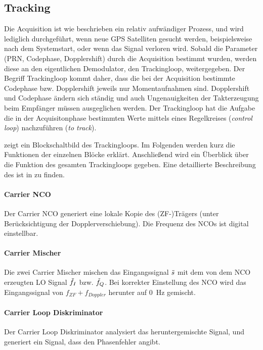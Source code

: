 \subsection{Tracking}
Die Acquisition ist wie beschrieben ein relativ aufwändiger Prozess, und wird lediglich durchgeführt, wenn neue GPS Satelliten gesucht werden, beispielsweise nach dem Systemstart, oder wenn das Signal verloren wird. Sobald die Parameter (PRN, Codephase, Dopplershift) durch die Acquisition bestimmt wurden, werden diese an den eigentlichen Demodulator, den Trackingloop, weitergegeben. Der Begriff Trackingloop kommt daher, dass die bei der Acquisition bestimmte Codephase bzw. Dopplershift jeweils nur Momentaufnahmen sind. Dopplershift und Codephase ändern sich ständig und auch Ungenauigkeiten der Takterzeugung beim Empfänger müssen ausgeglichen werden. Der Trackingloop hat die Aufgabe die in der Acquisitonphase bestimmten Werte mittels eines Regelkreises (\emph{control loop}) nachzuführen (\emph{to track}). 


 zeigt ein Blockschaltbild des Trackingloops. Im Folgenden werden kurz die Funktionen der einzelnen Blöcke erklärt. Anschließend wird ein Überblick über die Funktion des gesamten Trackingloops gegeben. Eine detaillierte Beschreibung des ist in \cite{borre2007software} zu finden.

\paragraph{Carrier NCO} Der Carrier \gls{NCO} generiert eine lokale Kopie des (ZF-)Trägers (unter Berücksichtigung der Dopplerverschiebung). Die Frequenz des NCOs ist digital einstellbar.

\paragraph{Carrier Mischer} Die zwei Carrier Mischer mischen das Eingangssignal $\tilde{s}$ mit dem von dem NCO erzeugten \gls{LO} Signal $\tilde{f}_I$ bzw. $\tilde{f}_Q$. Bei korrekter Einstellung des NCO wird das Eingangssignal von  $f_{ZF}+f_{Doppler}$ herunter auf \SI{0}{\Hz} gemischt.

\paragraph{Carrier Loop Diskriminator} Der Carrier Loop Diskriminator analysiert das heruntergemischte Signal, und generiert ein Signal, dass den Phasenfehler angibt.

